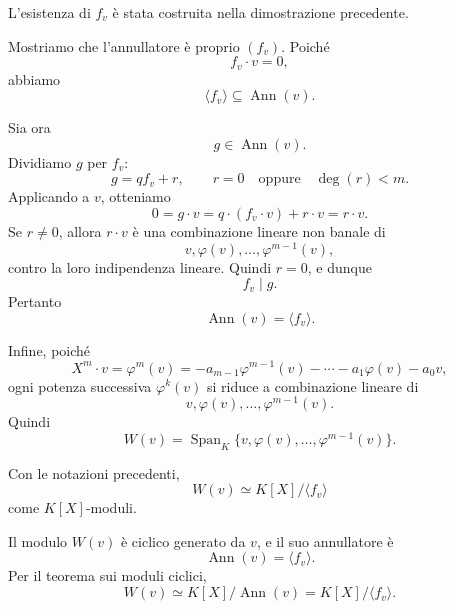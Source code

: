 \documentclass[a4paper]{article}
\begin{document}
\begin{radioactive}
\begin{snippetproof}{}
    L'esistenza di \(f_v\) è stata costruita nella dimostrazione precedente.

    Mostriamo che l'annullatore è proprio \((f_v)\).
    Poiché
    \[
        f_v\cdot v=0,
    \]
    abbiamo
    \[
        \langle f_v \rangle\subseteq\operatorname{Ann}(v).
    \]

    Sia ora
    \[
        g\in\operatorname{Ann}(v).
    \]
    Dividiamo \(g\) per \(f_v\):
    \[
        g=qf_v+r,
        \qquad
        r=0
        \quad
        \text{oppure}
        \quad
        \deg(r)<m.
    \]
    Applicando a \(v\), otteniamo
    \[
        0=g\cdot v=q\cdot(f_v\cdot v)+r\cdot v=r\cdot v.
    \]
    Se \(r\neq 0\), allora \(r\cdot v\) è una combinazione lineare non banale di
    \[
        v,\varphi(v),\ldots,\varphi^{m-1}(v),
    \]
    contro la loro indipendenza lineare.
    Quindi \(r=0\), e dunque
    \[
        f_v\mid g.
    \]
    Pertanto
    \[
        \operatorname{Ann}(v)=\langle f_v \rangle.
    \]

    Infine, poiché
    \[
        X^m\cdot v
        =
        \varphi^m(v)
        =
        -a_{m-1}\varphi^{m-1}(v)-\cdots-a_1\varphi(v)-a_0v,
    \]
    ogni potenza successiva \(\varphi^k(v)\) si riduce a combinazione lineare di
    \[
        v,\varphi(v),\ldots,\varphi^{m-1}(v).
    \]
    Quindi
    \[
        W(v)=\operatorname{Span}_K\{v,\varphi(v),\ldots,\varphi^{m-1}(v)\}.
    \]
\end{snippetproof}
\end{radioactive}

\begin{radioactive}
\begin{snippetcorollary}{}
    Con le notazioni precedenti,
    \[
        W(v)\simeq K[X]/\langle f_v \rangle
    \]
    come \(K[X]\)-moduli.
\end{snippetcorollary}
\end{radioactive}

\begin{radioactive}
\begin{snippetproof}{}
    Il modulo \(W(v)\) è ciclico generato da \(v\), e il suo annullatore è
    \[
        \operatorname{Ann}(v)=\langle f_v \rangle.
    \]
    Per il teorema sui moduli ciclici,
    \[
        W(v)\simeq K[X]/\operatorname{Ann}(v)=K[X]/\langle f_v \rangle.
    \]
\end{snippetproof}
\end{radioactive}
\end{document}
